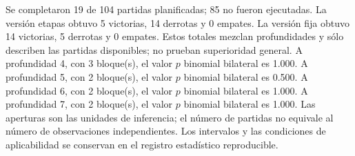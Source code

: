 Se completaron 19 de 104 partidas planificadas; 85 no fueron ejecutadas.
La versión etapas obtuvo 5 victorias, 14 derrotas y 0 empates.
La versión fija obtuvo 14 victorias, 5 derrotas y 0 empates.
Estos totales mezclan profundidades y sólo describen las partidas disponibles; no prueban superioridad general.
A profundidad 4, con 3 bloque(s), el valor $p$ binomial bilateral es 1.000.
A profundidad 5, con 2 bloque(s), el valor $p$ binomial bilateral es 0.500.
A profundidad 6, con 2 bloque(s), el valor $p$ binomial bilateral es 1.000.
A profundidad 7, con 2 bloque(s), el valor $p$ binomial bilateral es 1.000.
Las aperturas son las unidades de inferencia; el número de partidas no equivale al número de observaciones independientes. Los intervalos y las condiciones de aplicabilidad se conservan en el registro estadístico reproducible.
